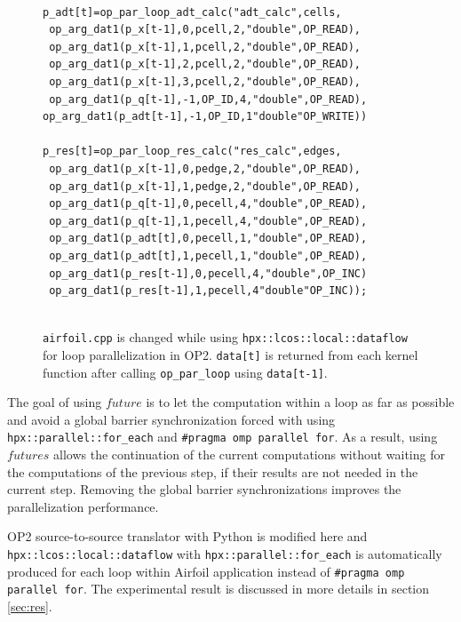 \documentclass[conference]{IEEEtran}
\begin{document}
\begin{figure} [!h]
    \begin{lstlisting}
    
p_adt[t]=op_par_loop_adt_calc("adt_calc",cells, 
 op_arg_dat1(p_x[t-1],0,pcell,2,"double",OP_READ),
 op_arg_dat1(p_x[t-1],1,pcell,2,"double",OP_READ),
 op_arg_dat1(p_x[t-1],2,pcell,2,"double",OP_READ),
 op_arg_dat1(p_x[t-1],3,pcell,2,"double",OP_READ),
 op_arg_dat1(p_q[t-1],-1,OP_ID,4,"double",OP_READ),
op_arg_dat1(p_adt[t-1],-1,OP_ID,1"double"OP_WRITE))

p_res[t]=op_par_loop_res_calc("res_calc",edges, 
 op_arg_dat1(p_x[t-1],0,pedge,2,"double",OP_READ),
 op_arg_dat1(p_x[t-1],1,pedge,2,"double",OP_READ),
 op_arg_dat1(p_q[t-1],0,pecell,4,"double",OP_READ),
 op_arg_dat1(p_q[t-1],1,pecell,4,"double",OP_READ),
 op_arg_dat1(p_adt[t],0,pecell,1,"double",OP_READ),
 op_arg_dat1(p_adt[t],1,pecell,1,"double",OP_READ),
 op_arg_dat1(p_res[t-1],0,pecell,4,"double",OP_INC)
 op_arg_dat1(p_res[t-1],1,pecell,4"double"OP_INC));
  
    \end{lstlisting}
    \caption{\small{\texttt{airfoil.cpp} is changed while using \texttt{hpx::lcos::local::dataflow} for loop parallelization in OP2. \texttt{data[t]} is returned from each kernel function after calling \texttt{op\_par\_loop} using \texttt{data[t-1]}.}}
    \label{l3c}
\end{figure}



The goal of using $future$ is to let the computation within a loop as far as possible and avoid a global barrier synchronization forced with using  \texttt{hpx::parallel::for\_each} and \texttt{\#pragma omp parallel for}. As a result, using $futures$ allows the continuation of the current computations without waiting for the computations of the previous step, if their results are not needed in the current step. Removing the global barrier synchronizations improves the parallelization performance. 

OP2 source-to-source translator with Python is modified here and \texttt{hpx::lcos::local::dataflow} with  \texttt{hpx::parallel::for\_each} is automatically produced for each loop within Airfoil application instead of \texttt{\#pragma omp parallel for}. The experimental result is discussed in more details in section \ref{sec:res}.


\end{document}
